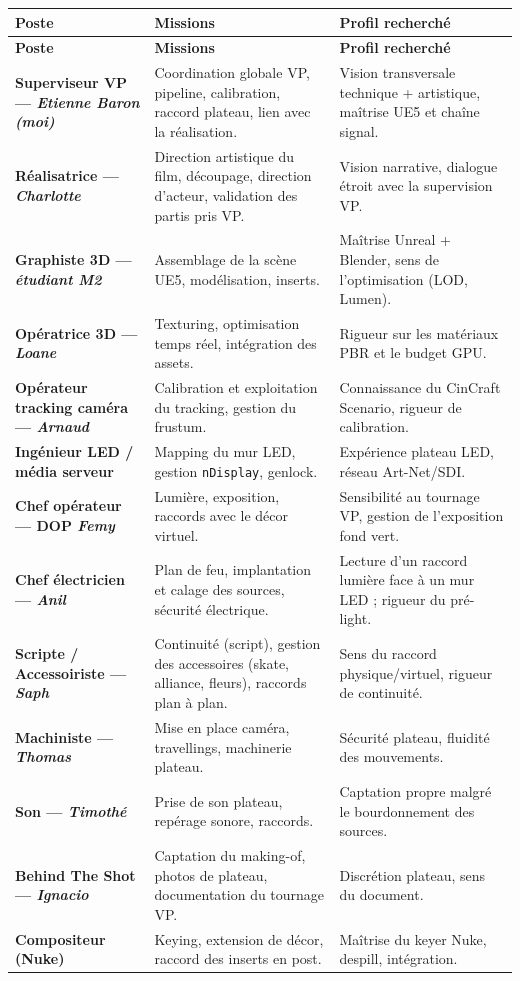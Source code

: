 \documentclass[11pt,a4paper]{report}
\begin{document}
\begin{center}
\small
\begin{longtable}{>{\bfseries}p{3.7cm} >{\RaggedRight\arraybackslash}p{5.0cm} >{\RaggedRight\arraybackslash}p{5.3cm}}
\rowcolor{brjaune}\textbf{Poste} & \textbf{Missions} & \textbf{Profil recherché} \\
\midrule
\endfirsthead
\rowcolor{brjaune}\textbf{Poste} & \textbf{Missions} & \textbf{Profil recherché} \\
\midrule
\endhead
Superviseur VP --- \textit{Etienne Baron (moi)} & Coordination globale VP, pipeline, calibration, raccord plateau, lien avec la réalisation. & Vision transversale technique + artistique, maîtrise UE5 et chaîne signal. \\
Réalisatrice --- \textit{Charlotte} & Direction artistique du film, découpage, direction d'acteur, validation des partis pris VP. & Vision narrative, dialogue étroit avec la supervision VP. \\
Graphiste 3D --- \textit{étudiant M2} & Assemblage de la scène UE5, modélisation, inserts. & Maîtrise Unreal + Blender, sens de l'optimisation (LOD, Lumen). \\
Opératrice 3D --- \textit{Loane} & Texturing, optimisation temps réel, intégration des assets. & Rigueur sur les matériaux PBR et le budget GPU. \\
Opérateur tracking caméra --- \textit{Arnaud} & Calibration et exploitation du tracking, gestion du frustum. & Connaissance du CinCraft Scenario, rigueur de calibration. \\
Ingénieur LED / média serveur & Mapping du mur LED, gestion \texttt{nDisplay}, genlock. & Expérience plateau LED, réseau Art-Net/SDI. \\
Chef opérateur --- DOP \textit{Femy} & Lumière, exposition, raccords avec le décor virtuel. & Sensibilité au tournage VP, gestion de l'exposition fond vert. \\
Chef électricien --- \textit{Anil} & Plan de feu, implantation et calage des sources, sécurité électrique. & Lecture d'un raccord lumière face à un mur LED ; rigueur du pré-light. \\
Scripte / Accessoiriste --- \textit{Saph} & Continuité (script), gestion des accessoires (skate, alliance, fleurs), raccords plan à plan. & Sens du raccord physique/virtuel, rigueur de continuité. \\
Machiniste --- \textit{Thomas} & Mise en place caméra, travellings, machinerie plateau. & Sécurité plateau, fluidité des mouvements. \\
Son --- \textit{Timothé} & Prise de son plateau, repérage sonore, raccords. & Captation propre malgré le bourdonnement des sources. \\
Behind The Shot --- \textit{Ignacio} & Captation du making-of, photos de plateau, documentation du tournage VP. & Discrétion plateau, sens du document. \\
Compositeur (Nuke) & Keying, extension de décor, raccord des inserts en post. & Maîtrise du keyer Nuke, despill, intégration. \\
\end{longtable}
\end{center}
\end{document}

